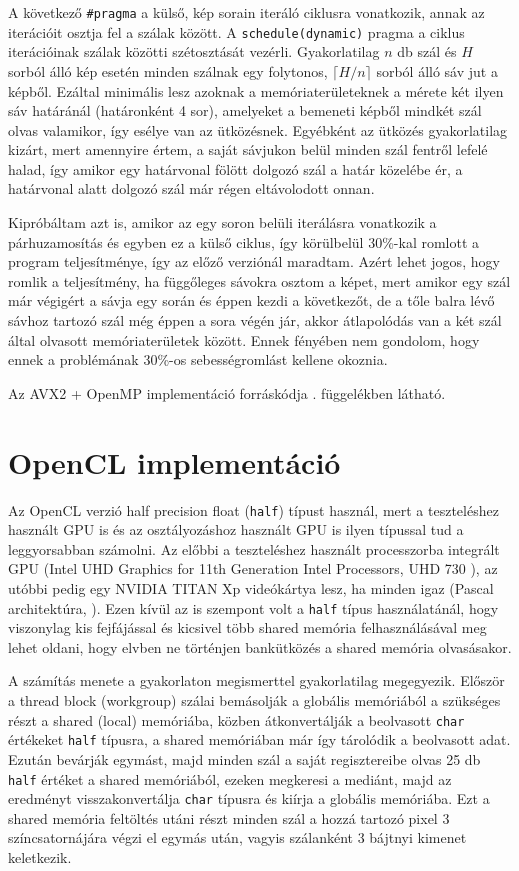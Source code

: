 			A következő \verb|#pragma| a külső, kép sorain iteráló ciklusra vonatkozik, annak az iterációit osztja fel a szálak között. A \verb|schedule(dynamic)| pragma a ciklus iterációinak szálak közötti szétosztását vezérli. Gyakorlatilag $n$ db szál és $H$ sorból álló kép esetén minden szálnak egy folytonos, $\lceil H/n\rceil$ sorból álló sáv jut a képből. Ezáltal minimális lesz azoknak a memóriaterületeknek a mérete két ilyen sáv határánál (határonként 4 sor), amelyeket a bemeneti képből mindkét szál olvas valamikor, így esélye van az ütközésnek. Egyébként az ütközés gyakorlatilag kizárt, mert amennyire értem, a saját sávjukon belül minden szál fentről lefelé halad, így amikor egy határvonal fölött dolgozó szál a határ közelébe ér, a határvonal alatt dolgozó szál már régen eltávolodott onnan.
			
			Kipróbáltam azt is, amikor az egy soron belüli iterálásra vonatkozik a párhuzamosítás és egyben ez a külső ciklus, így körülbelül 30\%-kal romlott a program teljesítménye, így az előző verziónál maradtam. Azért lehet jogos, hogy romlik a teljesítmény, ha függőleges sávokra osztom a képet, mert amikor egy szál már végigért a sávja egy során és éppen kezdi a következőt, de a tőle balra lévő sávhoz tartozó szál még éppen a sora végén jár, akkor  átlapolódás van a két szál által olvasott memóriaterületek között. Ennek fényében nem gondolom, hogy ennek a problémának 30\%-os sebességromlást kellene okoznia.

			Az AVX2 + OpenMP implementáció forráskódja . függelékben látható.


	\clearpage
	\section{OpenCL implementáció}
		Az OpenCL verzió half precision float (\verb|half|) típust használ, mert a teszteléshez használt GPU is és az osztályozáshoz használt GPU is ilyen típussal tud a leggyorsabban számolni. Az előbbi a teszteléshez használt processzorba integrált GPU (Intel UHD Graphics for 11th Generation Intel Processors, UHD 730 \cite{intel-opt-guide}), az utóbbi pedig egy NVIDIA TITAN Xp videókártya lesz, ha minden igaz (Pascal architektúra, \cite{pascal}). Ezen kívül az is szempont volt a \verb|half| típus használatánál, hogy viszonylag kis fejfájással és kicsivel több shared memória felhasználásával meg lehet oldani, hogy elvben ne történjen bankütközés a shared memória olvasásakor.

		A számítás menete a gyakorlaton megismerttel gyakorlatilag megegyezik. Először a thread block (workgroup) szálai bemásolják a globális memóriából a szükséges részt a shared (local) memóriába, közben átkonvertálják a beolvasott \verb|char| értékeket \verb|half| típusra, a shared memóriában már így tárolódik a beolvasott adat. Ezután bevárják egymást, majd minden szál a saját regisztereibe olvas 25 db \verb|half| értéket a shared memóriából, ezeken megkeresi a mediánt, majd az eredményt visszakonvertálja \verb|char| típusra és kiírja a globális memóriába. Ezt a shared memória feltöltés utáni részt minden szál a hozzá tartozó pixel 3 színcsatornájára végzi el egymás után, vagyis szálanként 3 bájtnyi kimenet keletkezik.
		
